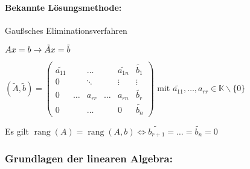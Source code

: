 \documentclass[a4paper]{scrartcl}
\newcommand{\rang}{\mathop{\mathrm{rang}}}
\begin{document}
\paragraph{Bekannte Lösungsmethode:} Gaußsches Eliminationsverfahren

$Ax=b \rightarrow \tilde{A}x= \tilde{b} \\$

$(\tilde{A},\tilde{b})=
\begin{pmatrix} 
\widetilde{a_{11}} & &\dots  &  & \widetilde{a_{1n}} & \widetilde{b_1} \\
0 & & \ddots &  & \vdots & \vdots \\
0 & \dots & a_{rr} & \dots & a_{rn} & \widetilde{b_r} \\
0 & & \dots & & 0 & \widetilde{b_n} \end{pmatrix} $
mit $\widetilde{a_{11}}, \dots, a_{rr} \in \mathbb{K} \backslash \{0\} $

Es gilt $\rang(A)= \rang (A,b) \Leftrightarrow 
\widetilde{b_{r+1}} = \dots = \widetilde{b_n} = 0 $

\subsubsection*{Grundlagen der linearen Algebra:}
\end{document}
